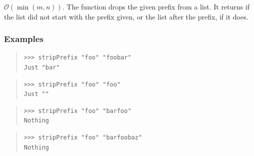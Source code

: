 \begin{haddockdesc}
\item[\begin{tabular}{@{}l}
stripPrefix :: Eq a => {\char 91}a{\char 93} -> {\char 91}a{\char 93} -> Maybe {\char 91}a{\char 93}
\end{tabular}]
{\haddockbegindoc
\(\mathcal{O}(\min(m,n))\). The  function drops the given
 prefix from a list. It returns  if the list did not start with the
 prefix given, or  the list after the prefix, if it does.\par
\subsubsection*{\textbf{Examples}}
\begin{quote}
{\haddockverb\begin{verbatim}
>>> stripPrefix "foo" "foobar"
Just "bar"

\end{verbatim}}
\end{quote}
\begin{quote}
{\haddockverb\begin{verbatim}
>>> stripPrefix "foo" "foo"
Just ""

\end{verbatim}}
\end{quote}
\begin{quote}
{\haddockverb\begin{verbatim}
>>> stripPrefix "foo" "barfoo"
Nothing

\end{verbatim}}
\end{quote}
\begin{quote}
{\haddockverb\begin{verbatim}
>>> stripPrefix "foo" "barfoobaz"
Nothing

\end{verbatim}}
\end{quote}}
\end{haddockdesc}

